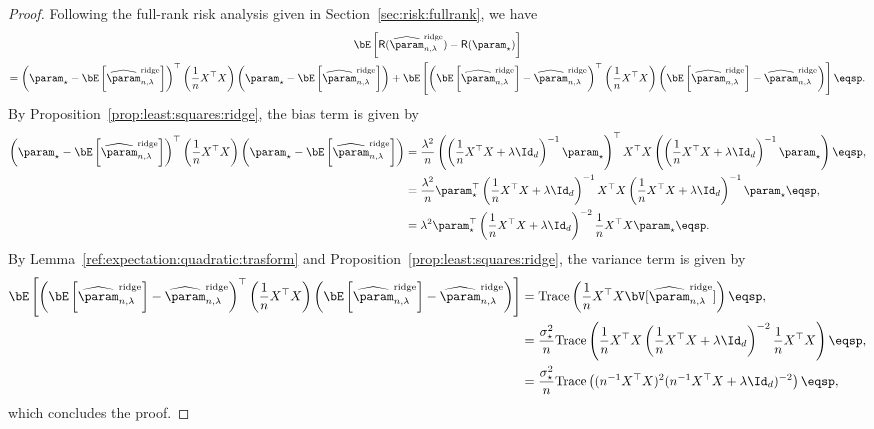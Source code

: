 \begin{proof}
Following the full-rank risk analysis given in Section~\ref{sec:risk:fullrank}, we have
\begin{multline*}
\bE\left[\mathsf{R}(\widehat \param^{\mathrm{ridge}}_{n,\lambda}) - \mathsf{R}(\param_\star)\right] \\
=\left(\param_\star-\bE\left[\widehat \param^{\mathrm{ridge}}_{n,\lambda}\right]\right)^\top \left(\frac{1}{n}X^\top X\right) \left(\param_\star-\bE\left[\widehat \param^{\mathrm{ridge}}_{n,\lambda}\right] \right) + \bE\left[ \left(\bE\left[\widehat \param^{\mathrm{ridge}}_{n,\lambda}\right] - \widehat \param^{\mathrm{ridge}}_{n,\lambda}\right)^\top \left(\frac{1}{n}X^\top X\right) \left(\bE\left[\widehat \param^{\mathrm{ridge}}_{n,\lambda}\right] - \widehat \param^{\mathrm{ridge}}_{n,\lambda}\right)\right]\eqsp.
\end{multline*}
By Proposition~\ref{prop:least:squares:ridge}, the bias term is given by
\begin{align*}
\left(\param_\star-\bE\left[\widehat \param^{\mathrm{ridge}}_{n,\lambda}\right]\right)^\top \left(\frac{1}{n}X^\top X\right) \left(\param_\star-\bE\left[\widehat \param^{\mathrm{ridge}}_{n,\lambda}\right] \right) &= \frac{\lambda^2}{n}\left(\left(\frac{1}{n}X^\top X + \lambda \Id_d\right)^{-1}\param_\star\right)^\top X^\top X  \left(\left(\frac{1}{n}X^\top X + \lambda \Id_d\right)^{-1}\param_\star\right)\eqsp,\\
&= \frac{\lambda^2}{n}\param_\star^\top\left(\frac{1}{n}X^\top X + \lambda \Id_d\right)^{-1} X^\top X \left(\frac{1}{n}X^\top X + \lambda \Id_d\right)^{-1}\param_\star\eqsp,\\
&= \lambda^2\param_\star^\top\left(\frac{1}{n}X^\top X + \lambda \Id_d\right)^{-2} \frac{1}{n}X^\top X \param_\star\eqsp.
\end{align*}
By Lemma~\ref{ref:expectation:quadratic:trasform} and  Proposition~\ref{prop:least:squares:ridge}, the variance term is given by
\begin{align*}
\bE\left[ \left(\bE\left[\widehat \param^{\mathrm{ridge}}_{n,\lambda}\right] - \widehat \param^{\mathrm{ridge}}_{n,\lambda}\right)^\top \left(\frac{1}{n}X^\top X\right) \left(\bE\left[\widehat \param^{\mathrm{ridge}}_{n,\lambda}\right] - \widehat \param^{\mathrm{ridge}}_{n,\lambda}\right)\right] &= \mathrm{Trace}\left(\frac{1}{n}X^\top X \bV[\widehat \param^{\mathrm{ridge}}_{n,\lambda}]\right)\eqsp,\\
&= \frac{\sigma_\star^{2}}{n}\mathrm{Trace}\left(\frac{1}{n}X^\top X\left(\frac{1}{n}X^\top X + \lambda \Id_d\right)^{-2}\frac{1}{n}X^\top X\right)\eqsp,\\
&= \frac{\sigma_\star^{2}}{n}\mathrm{Trace}\left((n^{-1}X^\top X)^2(n^{-1}X^\top X + \lambda \Id_d)^{-2}\right)\eqsp,
\end{align*}
which concludes the proof.
\end{proof}
